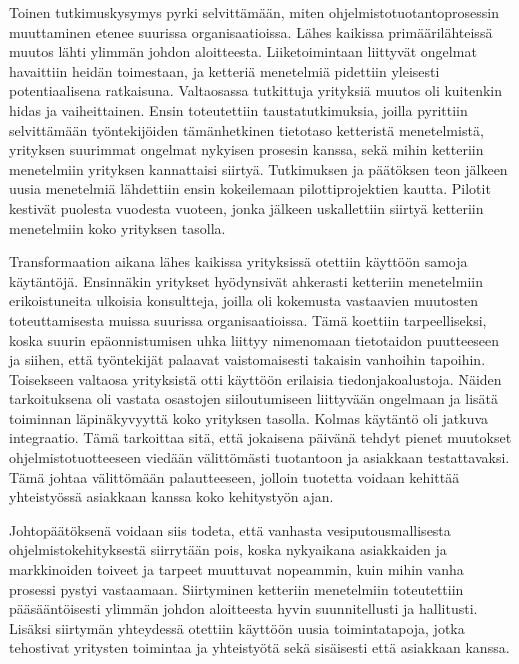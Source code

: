 \documentclass[12pt]{article}
\begin{document}
Toinen tutkimuskysymys pyrki selvittämään, miten
ohjelmistotuotantoprosessin muuttaminen etenee suurissa
organisaatioissa. Lähes kaikissa primäärilähteissä muutos lähti ylimmän
johdon aloitteesta. Liiketoimintaan liittyvät ongelmat havaittiin heidän
toimestaan, ja ketteriä menetelmiä pidettiin yleisesti potentiaalisena
ratkaisuna. Valtaosassa tutkittuja yrityksiä muutos oli kuitenkin hidas
ja vaiheittainen. Ensin toteutettiin taustatutkimuksia, joilla pyrittiin
selvittämään työntekijöiden tämänhetkinen tietotaso ketteristä
menetelmistä, yrityksen suurimmat ongelmat nykyisen prosesin kanssa,
sekä mihin ketteriin menetelmiin yrityksen kannattaisi siirtyä.
Tutkimuksen ja päätöksen teon jälkeen uusia menetelmiä lähdettiin ensin
kokeilemaan pilottiprojektien kautta. Pilotit kestivät puolesta vuodesta
vuoteen, jonka jälkeen uskallettiin siirtyä ketteriin menetelmiin koko
yrityksen tasolla.

Transformaation aikana lähes kaikissa yrityksissä otettiin käyttöön
samoja käytäntöjä. Ensinnäkin yritykset hyödynsivät ahkerasti ketteriin
menetelmiin erikoistuneita ulkoisia konsultteja, joilla oli kokemusta
vastaavien muutosten toteuttamisesta muissa suurissa organisaatioissa.
Tämä koettiin tarpeelliseksi, koska suurin epäonnistumisen uhka liittyy
nimenomaan tietotaidon puutteeseen ja siihen, että työntekijät palaavat
vaistomaisesti takaisin vanhoihin tapoihin. Toisekseen valtaosa
yrityksistä otti käyttöön erilaisia tiedonjakoalustoja. Näiden
tarkoituksena oli vastata osastojen siiloutumiseen liittyvään ongelmaan
ja lisätä toiminnan läpinäkyvyyttä koko yrityksen tasolla. Kolmas
käytäntö oli jatkuva integraatio. Tämä tarkoittaa sitä, että jokaisena
päivänä tehdyt pienet muutokset ohjelmistotuotteeseen viedään
välittömästi tuotantoon ja asiakkaan testattavaksi. Tämä johtaa
välittömään palautteeseen, jolloin tuotetta voidaan kehittää
yhteistyössä asiakkaan kanssa koko kehitystyön ajan.

Johtopäätöksenä voidaan siis todeta, että vanhasta vesiputousmallisesta
ohjelmistokehityksestä siirrytään pois, koska nykyaikana asiakkaiden ja
markkinoiden toiveet ja tarpeet muuttuvat nopeammin, kuin mihin vanha
prosessi pystyi vastaamaan. Siirtyminen ketteriin menetelmiin
toteutettiin pääsääntöisesti ylimmän johdon aloitteesta hyvin
suunnitellusti ja hallitusti. Lisäksi siirtymän yhteydessä otettiin
käyttöön uusia toimintatapoja, jotka tehostivat yritysten toimintaa ja
yhteistyötä sekä sisäisesti että asiakkaan kanssa.
\end{document}
